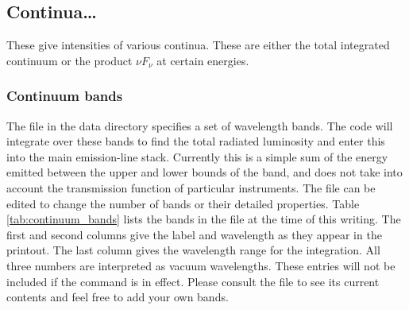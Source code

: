 \subsection{Continua\dots}

These give intensities of various continua.  These are either the total
integrated continuum or the product $\nu F_\nu$ at certain energies.

\subsubsection{Continuum bands}
The file  in the data directory
specifies a set of wavelength bands.
The code will integrate over these bands to find the
total radiated luminosity and enter this into the main emission-line stack.
Currently this is a simple sum of the energy emitted between the upper and
lower bounds of the band, and does not take into account the transmission function
of particular instruments.
The  file can be edited to change 
the number of bands or their detailed properties.
Table \ref{tab:continuum_bands} lists the bands in the file at the
time of this writing.
The first and second columns give
the label and wavelength as they appear in the printout.
The last column
gives the wavelength range for the integration.
All three numbers are interpreted as vacuum wavelengths.
These entries will not be included if the  command is in effect.
Please consult the file to see its current contents
and feel free to add your own bands.

